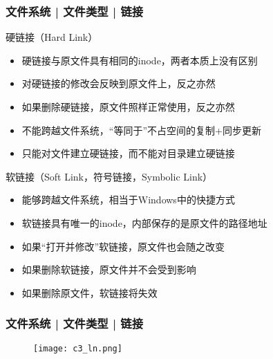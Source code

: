 \begin{frame}
  \frametitle{文件系统 | 文件类型 | \alert{链接}}
  \begin{block}{硬链接（Hard Link）}
    \begin{itemize}[<+->]
      \item 硬链接与原文件具有相同的inode，两者本质上没有区别
      \item 对硬链接的修改会反映到原文件上，反之亦然
      \item 如果删除硬链接，原文件照样正常使用，反之亦然
      \item 不能跨越文件系统，“等同于”不占空间的复制+同步更新
      \item 只能对文件建立硬链接，而不能对目录建立硬链接
    \end{itemize}
  \end{block}
  \pause
  \begin{block}{软链接（Soft Link，符号链接，Symbolic Link）}
    \begin{itemize}[<+->]
      \item 能够跨越文件系统，相当于Windows中的快捷方式
      \item 软链接具有唯一的inode，内部保存的是原文件的路径地址
      \item 如果“打开并修改”软链接，原文件也会随之改变
      \item 如果删除软链接，原文件并不会受到影响
      \item 如果删除原文件，软链接将失效
    \end{itemize}
  \end{block}
\end{frame}

\begin{frame}
  \frametitle{文件系统 | 文件类型 | 链接}
  \begin{figure}
    \centering
    \texttt{[image: c3\_ln.png]}
  \end{figure}
\end{frame}

